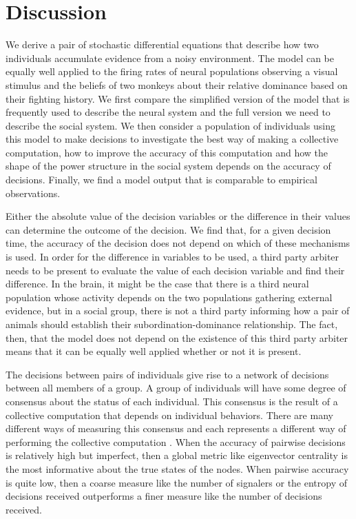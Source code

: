 \documentclass{article}
\begin{document}
\section{Discussion}

We derive a pair of stochastic differential equations that describe how two individuals accumulate evidence from a noisy environment.  The model can be equally well applied to the firing rates of neural populations observing a visual stimulus and the beliefs of two monkeys about their relative dominance based on their fighting history.   We first compare the simplified version of the model that is frequently used to describe the neural system and the full version we need to describe the social system.  We then consider a population of individuals using this model to make decisions to investigate the best way of making a collective computation, how to improve the accuracy of this computation and how the shape of the power structure in the social system depends on the accuracy of decisions.  Finally, we find a model output that is comparable to empirical observations.

Either the absolute value of the decision variables or the difference in their values can determine the outcome of the decision.  We find that, for a given decision time, the accuracy of the decision does not depend on which of these mechanisms is used.  In order for the difference in variables to be used, a third party arbiter needs to be present to evaluate the value of each decision variable and find their difference.  In the brain, it might be the case that there is a third neural population whose activity depends on the two populations gathering external evidence, but in a social group, there is not a third party informing how a pair of animals should establish their subordination-dominance relationship.  The fact, then, that the model does not depend on the existence of this third party arbiter means that it can be equally well applied whether or not it is present.

The decisions between pairs of individuals give rise to a network of decisions between all members of a group. A group of individuals will have some degree of consensus about the status of each individual. This consensus is the result of a collective computation that depends on individual behaviors.  There are many different ways of measuring this consensus and each represents a different way of performing the collective computation \cite{Brush:2013fk,Flack:2006uq}. When the accuracy of pairwise decisions is relatively high but imperfect, then a global metric like eigenvector centrality is the most informative about the true states of the nodes. When pairwise accuracy is quite low, then a coarse measure like the number of signalers or the entropy of decisions received outperforms a finer measure like the number of decisions received.
\end{document}
